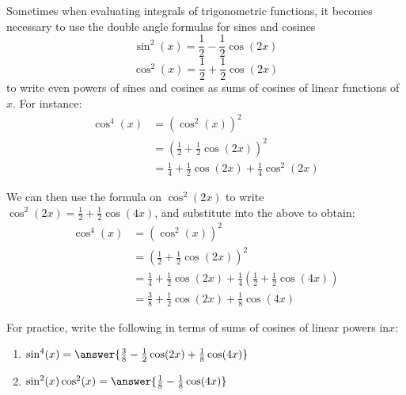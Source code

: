 \documentclass{ximera}
\begin{document}
\begin{problem}
  Sometimes when evaluating integrals of trigonometric​ functions, it becomes necessary to use the double angle formulas for sines and​ cosines
  \[
    \sin^2(x) = \frac{1}{2} - \frac{1}{2}\cos(2x)
  \]
  \[
    \cos^2(x) = \frac{1}{2} + \frac{1}{2}\cos(2x)
  \]
  to write even powers of sines and cosines as sums of cosines of linear functions of $x$.
  For instance:
  \begin{align*}
    \cos^4(x) &= (\cos^2(x))^2 \\
    &= \left(\frac{1}{2} + \frac{1}{2}\cos(2x)\right)^2 \\
    &= \frac{1}{4} + \frac{1}{2}\cos(2x) + \frac{1}{4}\cos^2(2x)
  \end{align*}
  
  We can then use the formula on $\cos^2(2x)$ to write $\cos^2(2x) = \frac{1}{2} + \frac{1}{2}\cos(4x)$, and substitute into the above to obtain:
  \begin{align*}
    \cos^4(x) &= (\cos^2(x))^2\\
    &= \left(\frac{1}{2} + \frac{1}{2}\cos(2x)\right)^2 \\
    &= \frac{1}{4} + \frac{1}{2}\cos(2x) + \frac{1}{4}\left( \frac{1}{2} + \frac{1}{2}\cos(4x)\right) \\
    &= \frac{3}{8} + \frac{1}{2}\cos(2x) + \frac{1}{8}\cos(4x)
  \end{align*}
  
  For​ practice, write the following in terms of sums of cosines of
  linear powers in​ $x$:
  
  \begin{enumerate}
    \item $\sin^4(x) = \answer{\frac{3}{8} - \frac{1}{2}\cos(2x) + \frac{1}{8}\cos(4x)}$

    \item $\sin^2(x)\cos^2(x) = \answer{\frac{1}{8} - \frac{1}{8}\cos(4x)}$
  \end{enumerate}
\end{problem}
\end{document}
